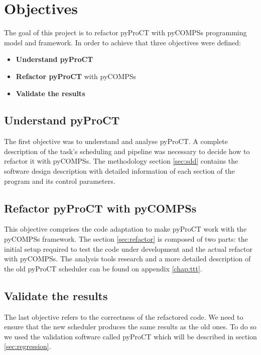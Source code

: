 \chapter{Objectives}

The goal of this project is to refactor pyProCT with pyCOMPSs programming model and framework. In order to achieve that three objectives were defined:

\begin{itemize}
\item \textbf{Understand pyProCT} 
\item \textbf{Refactor pyProCT} with pyCOMPSs
\item \textbf{Validate the results}
\end{itemize}


\section{Understand pyProCT}

The first objective was to understand and analyse pyProCT. A complete description of the task's scheduling and pipeline was necessary to decide how to refactor it with pyCOMPSs. The methodology section \ref{sec:sdd} contains the software design description with detailed information of each section of the program and its control parameters.

\section {Refactor pyProCT with pyCOMPSs}

This objective comprises the code adaptation to make pyProCT work with the pyCOMPSs framework. The section \ref{sec:refactor} is composed of two parts: the initial setup required to test the code under development and the actual refactor with pyCOMPSs. The analysis tools research and a more detailed description of the old pyProCT scheduler can be found on appendix \ref{chap:ttt}.

\section{Validate the results}
 
The last objective refers to the correctness of the refactored code. We need to ensure that the new scheduler produces the same results as the old ones. To do so we used the validation software called pyProCT which will be described in section \ref{sec:regression}.